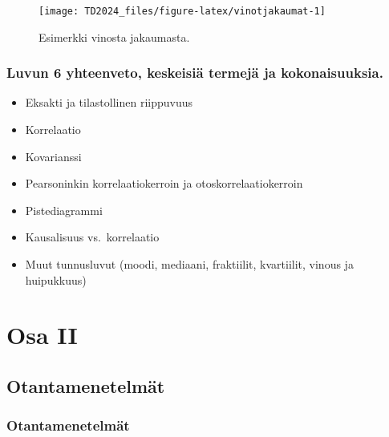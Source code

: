 \documentclass[
]{book}
\providecommand{\tightlist}{%
  \setlength{\itemsep}{0pt}\setlength{\parskip}{0pt}}
\begin{document}
\begin{figure}

{\centering \texttt{[image: TD2024\_files/figure-latex/vinotjakaumat-1]} 

}

\caption{Esimerkki vinosta jakaumasta.}\label{fig:vinotjakaumat}
\end{figure}

\hypertarget{luvun-6-yhteenveto-keskeisiuxe4-termejuxe4-ja-kokonaisuuksia.}{%
\section{Luvun 6 yhteenveto, keskeisiä termejä ja kokonaisuuksia.}\label{luvun-6-yhteenveto-keskeisiuxe4-termejuxe4-ja-kokonaisuuksia.}}

\begin{itemize}
\tightlist
\item
  Eksakti ja tilastollinen riippuvuus
\item
  Korrelaatio
\item
  Kovarianssi
\item
  Pearsoninkin korrelaatiokerroin ja otoskorrelaatiokerroin
\item
  Pistediagrammi
\item
  Kausalisuus vs.~korrelaatio
\item
  Muut tunnusluvut (moodi, mediaani, fraktiilit, kvartiilit, vinous ja huipukkuus)
\end{itemize}


\hypertarget{part-osa-ii}{%
\part{Osa II}\label{part-osa-ii}}

\hypertarget{luku7}{%
\chapter{Otantamenetelmät}\label{luku7}}

\hypertarget{alaluku71}{%
\section{Otantamenetelmät}\label{alaluku71}}
\end{document}
